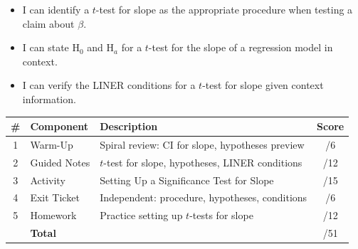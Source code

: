 \documentclass[10pt]{article}
\begin{document}

\vspace{2.4cm}
\namedateperiod

\begin{learningtargetbox}
\begin{itemize}
    \item I can identify a $t$-test for slope as the appropriate procedure when
          testing a claim about $\beta$.
    \item I can state H$_0$ and H$_a$ for a $t$-test for the slope of a regression
          model in context.
    \item I can verify the LINER conditions for a $t$-test for slope given context
          information.
\end{itemize}
\end{learningtargetbox}

\begin{tocbox}
\renewcommand{\arraystretch}{1.5}
\begin{tabularx}{\linewidth}{clXc}
    \textbf{\#} & \textbf{Component} & \textbf{Description} & \textbf{Score} \\
    \hline
    1 & Warm-Up      & Spiral review: CI for slope, hypotheses preview & \hfill/6 \\
    2 & Guided Notes & $t$-test for slope, hypotheses, LINER conditions & \hfill/12 \\
    3 & Activity     & Setting Up a Significance Test for Slope & \hfill/15 \\
    4 & Exit Ticket  & Independent: procedure, hypotheses, conditions & \hfill/6 \\
    5 & Homework     & Practice setting up $t$-tests for slope & \hfill/12 \\
    \hline
       & \multicolumn{2}{l}{\textbf{Total}} & \hfill/51 \\
\end{tabularx}
\end{tocbox}
\end{document}
